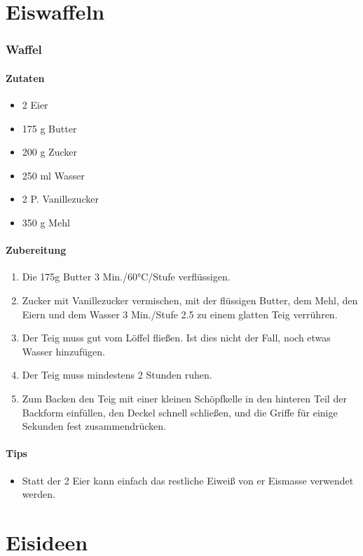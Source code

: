 \documentclass[12pt]{article}
\begin{document}
\newpage
\part{Eiswaffeln}
\section {Waffel}
\subsection{Zutaten}
\begin{itemize}
  \item 2 Eier
  \item 175 g Butter
  \item 200 g Zucker
  \item 250 ml Wasser
  \item 2 P. Vanillezucker
  \item 350 g Mehl
\end{itemize}
\subsection{Zubereitung}
\begin{enumerate}
  \item Die 175g Butter  3 Min./60°C/Stufe verflüssigen.
  \item Zucker mit Vanillezucker vermischen, mit der flüssigen Butter, dem Mehl, den Eiern und dem Wasser 3 Min./Stufe 2.5 zu einem glatten Teig verrühren.
  \item Der Teig muss gut vom Löffel fließen. Ist dies nicht der Fall, noch etwas Wasser hinzufügen.
  \item Der Teig muss mindestens 2 Stunden ruhen.
  \item Zum Backen den Teig mit einer kleinen Schöpfkelle in den hinteren Teil der Backform einfüllen, den Deckel schnell schließen, und die Griffe für einige Sekunden fest zusammendrücken.
\end{enumerate}
\subsection{Tips}
\begin{itemize}
  \item Statt der 2 Eier kann einfach das restliche Eiweiß von er Eismasse verwendet werden.
\end{itemize}


\newpage
\part{Eisideen}
\end{document}

